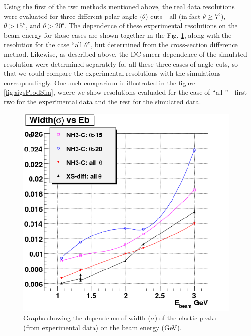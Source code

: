  



Using the first of the two methods mentioned above, the real data resolutions were evaluated for three different %
polar angle ($\theta$) cuts - 
all \th (in fact $\theta\ge7^o$), $\theta>15^o$, and $\theta>20^o$. The dependence of these experimental resolutions on the beam energy for these cases are 
shown together in the Fig. \ref{fig:sigsProd}, along with the resolution for the case ``all $\theta$'', but determined from the cross-section difference 
method. Likewise, as described above, the DC-smear dependence of the simulated resolution were determined separately for all these three cases of 
angle cuts, so that we could compare the experimental resolutions with the simulations correspondingly. One such comparison is illustrated in 
the figure \ref{fig:sigsProdSim}, where we show resolutions evaluated for the case of ``all \th'' - first two for the experimental data and the rest for 
the simulated data. 

    
     
 \begin{figure}[h] %
\centering
  \leavevmode \includegraphics[width=1.0\textwidth]{figuresEG4/DcSmear/graphSigmaVsEb_prodOnly.png} 
  \caption[$E_{beam}$ dependence of DC smearing (Experimental) ]{Graphs showing the dependence of width ($\sigma$) of the elastic peaks (from experimental data) on the beam energy (GeV).}
  \label{fig:sigsProd}
\end{figure}
    
